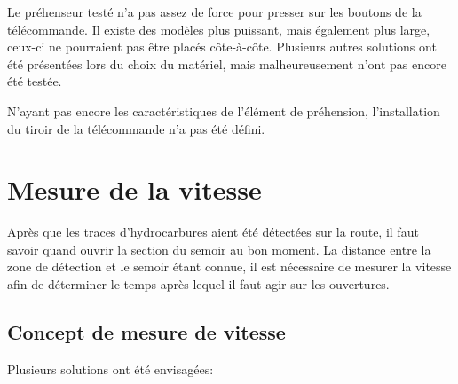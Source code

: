 Le préhenseur testé n'a pas assez de force pour presser sur les boutons de la télécommande. Il existe des modèles plus puissant, mais également
plus large, ceux-ci ne pourraient pas être placés côte-à-côte. Plusieurs autres solutions ont été présentées lors du choix du matériel, mais malheureusement
n'ont pas encore été testée.

N'ayant pas encore les caractéristiques de l'élément de préhension, l'installation du tiroir de la télécommande n'a pas été défini.

\section{Mesure de la vitesse}
Après que les traces d'hydrocarbures aient été détectées sur la route, il faut savoir quand ouvrir la section du semoir au bon moment. La distance entre la zone de détection et le semoir étant connue,
il est nécessaire de mesurer la vitesse afin de déterminer le temps après lequel il faut agir sur les ouvertures.
\subsection{Concept de mesure de vitesse}
Plusieurs solutions ont été envisagées:


